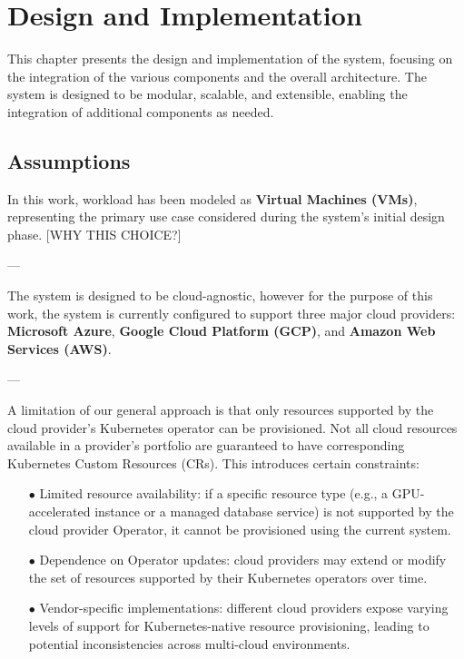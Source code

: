 \chapter{Design and Implementation}
\label{cha:design}

This chapter presents the design and implementation of the system, focusing on the integration of the various components and the overall architecture. The system is designed to be modular, scalable, and extensible, enabling the integration of additional components as needed.

\section{Assumptions}

In this work, workload has been modeled as \textbf{Virtual Machines (VMs)}, representing the primary use case considered during the system's initial design phase. 
[WHY THIS CHOICE?]

---

The system is designed to be cloud-agnostic, however for the purpose of this work, the system is currently configured to support three major cloud providers: \textbf{Microsoft Azure}, \textbf{Google Cloud Platform (GCP)}, and \textbf{Amazon Web Services (AWS)}.

---

A limitation of our general approach is that only resources supported by the cloud provider’s Kubernetes operator can be provisioned. Not all cloud resources available in a provider’s portfolio are guaranteed to have corresponding Kubernetes Custom Resources (CRs). This introduces certain constraints:

\begin{itemize}[itemsep=0.2pt, topsep=1pt]
  \item[$\bullet$] Limited resource availability: if a specific resource type (e.g., a GPU-accelerated instance or a managed database service) is not supported by the cloud provider Operator, it cannot be provisioned using the current system.
  \item[$\bullet$] Dependence on Operator updates: cloud providers may extend or modify the set of resources supported by their Kubernetes operators over time.
  \item[$\bullet$] Vendor-specific implementations: different cloud providers expose varying levels of support for Kubernetes-native resource provisioning, leading to potential inconsistencies across multi-cloud environments.
\end{itemize}

